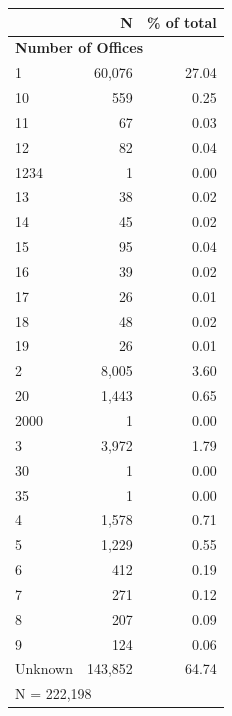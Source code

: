 \begin{tabular}{lrr}


\toprule


 & N & \% of total \\


\midrule


\multicolumn{3}{l}{\textbf{Number of Offices}}\\ 
\midrule
1                   &      60,076&       27.04\\
10                  &         559&        0.25\\
11                  &          67&        0.03\\
12                  &          82&        0.04\\
1234                &           1&        0.00\\
13                  &          38&        0.02\\
14                  &          45&        0.02\\
15                  &          95&        0.04\\
16                  &          39&        0.02\\
17                  &          26&        0.01\\
18                  &          48&        0.02\\
19                  &          26&        0.01\\
2                   &       8,005&        3.60\\
20                  &       1,443&        0.65\\
2000                &           1&        0.00\\
3                   &       3,972&        1.79\\
30                  &           1&        0.00\\
35                  &           1&        0.00\\
4                   &       1,578&        0.71\\
5                   &       1,229&        0.55\\
6                   &         412&        0.19\\
7                   &         271&        0.12\\
8                   &         207&        0.09\\
9                   &         124&        0.06\\
Unknown             &     143,852&       64.74\\
\midrule


\multicolumn{3}{l}{\footnotesize N =      222,198}\\


\bottomrule


\end{tabular}


